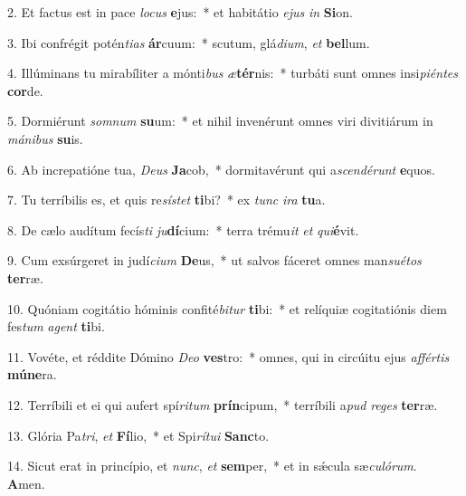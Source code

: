 2. Et factus est in pace \textit{lo}\textit{cus} \textbf{e}jus:~*  et habitátio \textit{e}\textit{jus} \textit{in} \textbf{Si}on.\

3. Ibi confrégit potén\textit{ti}\textit{as} \textbf{ár}cuum:~*  scutum, glá\textit{di}\textit{um}, \textit{et} \textbf{bel}lum.\

4. Illúminans tu mirabíliter a mónti\textit{bus} \textit{æ}\textbf{tér}nis:~*  turbáti sunt omnes insi\textit{pi}\textit{én}\textit{tes} \textbf{cor}de.\

5. Dormiérunt \textit{som}\textit{num} \textbf{su}um:~*  et nihil invenérunt omnes viri divitiárum in \textit{má}\textit{ni}\textit{bus} \textbf{su}is.\

6. Ab increpatióne tua, \textit{De}\textit{us} \textbf{Ja}cob,~*  dormitavérunt qui a\textit{scen}\textit{dé}\textit{runt} \textbf{e}quos.\

7. Tu terríbilis es, et quis re\textit{sís}\textit{tet} \textbf{ti}bi?~*  ex \textit{tunc} \textit{i}\textit{ra} \textbf{tu}a.\

8. De cælo audítum fecís\textit{ti} \textit{ju}\textbf{dí}cium:~*  terra trému\textit{it} \textit{et} \textit{qui}\textbf{é}vit.\

9. Cum exsúrgeret in judí\textit{ci}\textit{um} \textbf{De}us,~*  ut salvos fáceret omnes man\textit{su}\textit{é}\textit{tos} \textbf{ter}ræ.\

10. Quóniam cogitátio hóminis confité\textit{bi}\textit{tur} \textbf{ti}bi:~*  et relíquiæ cogitatiónis diem fes\textit{tum} \textit{a}\textit{gent} \textbf{ti}bi.\

11. Vovéte, et réddite Dómino \textit{De}\textit{o} \textbf{ves}tro:~*  omnes, qui in circúitu ejus \textit{af}\textit{fér}\textit{tis} \textbf{mú}\textbf{ne}ra.\

12. Terríbili et ei qui aufert spí\textit{ri}\textit{tum} \textbf{prín}cipum,~*  terríbili a\textit{pud} \textit{re}\textit{ges} \textbf{ter}ræ.\

13. Glória Pa\textit{tri}, \textit{et} \textbf{Fí}lio,~*  et Spi\textit{rí}\textit{tu}\textit{i} \textbf{Sanc}to.\

14. Sicut erat in princípio, et \textit{nunc}, \textit{et} \textbf{sem}per,~*  et in sǽcula sæ\textit{cu}\textit{ló}\textit{rum}. \textbf{A}men.\

